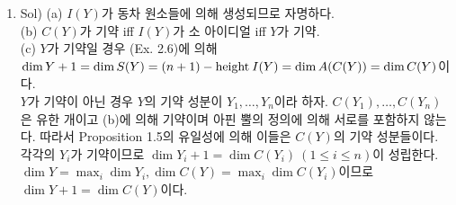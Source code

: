 	\begin{enumerate}[label=,itemindent=0mm]
	\item Sol) (a) $I(Y)$가 동차 원소들에 의해 생성되므로 자명하다.\\
	(b) $C(Y)$가 기약 iff $I(Y)$가 소 아이디얼 iff $Y$가 기약.\\
	(c) $Y$가 기약일 경우 (Ex. 2.6)에 의해 $\dim Y+1=\dim S(Y)=(n+1)-\mathrm{height}\:I(Y)=\dim A(C(Y))=\dim C(Y)$이다.\\
	$Y$가 기약이 아닌 경우 $Y$의 기약 성분이 $Y_1,\ldots,Y_n$이라 하자.
	$C(Y_1),\ldots,C(Y_n)$은 유한 개이고 (b)에 의해 기약이며 아핀 뿔의 정의에 의해 서로를 포함하지 않는다.
	따라서 Proposition 1.5의 유일성에 의해 이들은 $C(Y)$의 기약 성분들이다.
	각각의 $Y_i$가 기약이므로 $\dim Y_i+1=\dim C(Y_i)\:(1\le i\le n)$이 성립한다.
	$\dim Y=\max_i\dim Y_i,\dim C(Y)=\max_i\dim C(Y_i)$이므로 $\dim Y+1=\dim C(Y)$이다.\\
	\end{enumerate}
